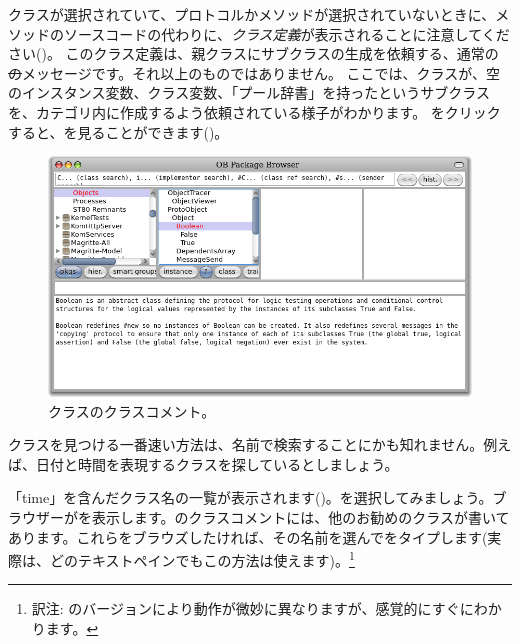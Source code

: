 \documentclass[a4paper,10pt,twoside]{book}
\begin{document}
 クラスが選択されていて、プロトコルかメソッドが選択されていないときに、メソッドのソースコードの代わりに、\emph{クラス定義}が表示されることに注意してください()。
このクラス定義は、親クラスにサブクラスの生成を依頼する、通常の \st のメッセージです。それ以上のものではありません。
ここでは、クラスが、空のインスタンス変数、クラス変数、「プール辞書」を持ったというサブクラスを、カテゴリ内に作成するよう依頼されている様子がわかります。
 をクリックすると、を見ることができます()。

\begin{figure}[hbt]
\centerline {\includegraphics[width=\textwidth]{classComment}}
\caption{クラスのクラスコメント。
}
\end{figure}

クラスを見つける一番速い方法は、名前で検索することにかも知れません。例えば、日付と時間を表現するクラスを探しているとしましょう。

\noindent
「time」を含んだクラス名の一覧が表示されます()。を選択してみましょう。ブラウザーがを表示します。のクラスコメントには、他のお勧めのクラスが書いてあります。これらをブラウズしたければ、その名前を選んでをタイプします(実際は、どのテキストペインでもこの方法は使えます)。\footnote{訳注: \pharo のバージョンにより動作が微妙に異なりますが、感覚的にすぐにわかります。}
\end{document}
